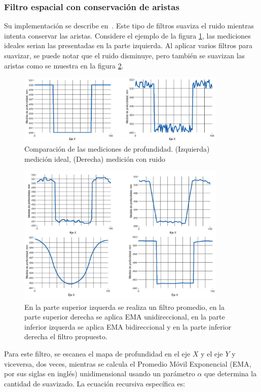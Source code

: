 \subsubsection{Filtro espacial con conservación de aristas}

Su implementación se describe en~\cite{gastal2011domain}. Este tipo de filtros suaviza el ruido mientras intenta conservar las aristas. Considere el ejemplo de la figura \ref{fig:space1}, las mediciones ideales serian las presentadas en la parte izquierda. Al aplicar varios filtros para suavizar, se puede notar que el ruido disminuye, pero también se suavizan las aristas como se muestra en la figura \ref{fig:space2}.

\begin{figure}[ht]
	\centering
	\includegraphics[width=10cm]{./Graphics/figura1.png}
	\caption{Comparación de las mediciones de profundidad. (Izquierda) medición ideal, (Derecha) medición con ruido}
	\label{fig:space1}
\end{figure}

\begin{figure}[ht]
	\centering
	\includegraphics[width=10cm]{./Graphics/figura2.png}
	\caption{En la parte superior izquerda se realiza un filtro promedio, en la parte	superior derecha se aplica EMA unidireccional, en la parte inferior izquerda se aplica EMA bidireccional y en la parte inferior derecha el filtro propuesto.}
	\label{fig:space2}
\end{figure}

Para este filtro, se escanea el mapa de profundidad en el eje $X$ y el eje $Y$ y viceversa, dos veces, mientras se calcula el Promedio Móvil Exponencial (EMA, por sus siglas en inglés) unidimensional usando un parámetro $\alpha$ que determina la cantidad de suavizado. La ecuación recursiva específica es:

